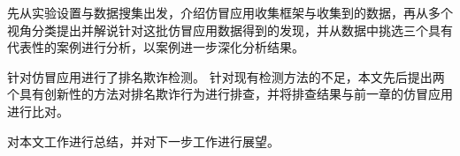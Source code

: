  先从实验设置与数据搜集出发，介绍仿冒应用收集框架\mytool 与收集到的数据，再从多个视角分类提出并解说针对这批仿冒应用数据得到的发现，并从数据中挑选三个具有代表性的案例进行分析，以案例进一步深化分析结果。

 针对仿冒应用进行了排名欺诈检测。
针对现有检测方法的不足，本文先后提出两个具有创新性的方法对排名欺诈行为进行排查，并将排查结果与前一章的仿冒应用进行比对。

 对本文工作进行总结，并对下一步工作进行展望。
